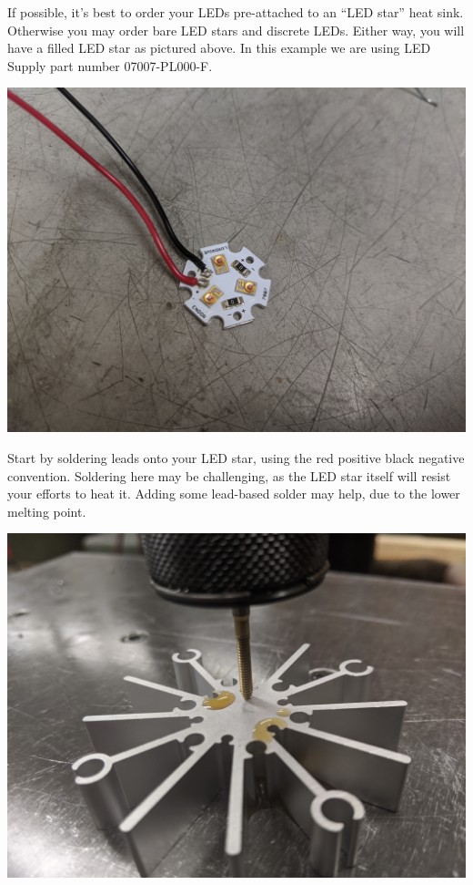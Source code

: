 \documentclass[11pt]{article}
\begin{document}
If possible, it's best to order your LEDs pre-attached to an ``LED star'' heat sink.
Otherwise you may order bare LED stars and discrete LEDs.
Either way, you will have a filled LED star as pictured above.
In this example we are using LED Supply part number 07007-PL000-F.

\begin{center}
  \includegraphics[width=\textwidth/2]{"./soldered-led.jpg"}
\end{center}

Start by soldering leads onto your LED star, using the red positive black negative convention.
Soldering here may be challenging, as the LED star itself will resist your efforts to heat it.
Adding some lead-based solder may help, due to the lower melting point.

\begin{center}
  \includegraphics[width=\textwidth/2]{"./tap-heatsink.jpg"}
\end{center}
\end{document}
